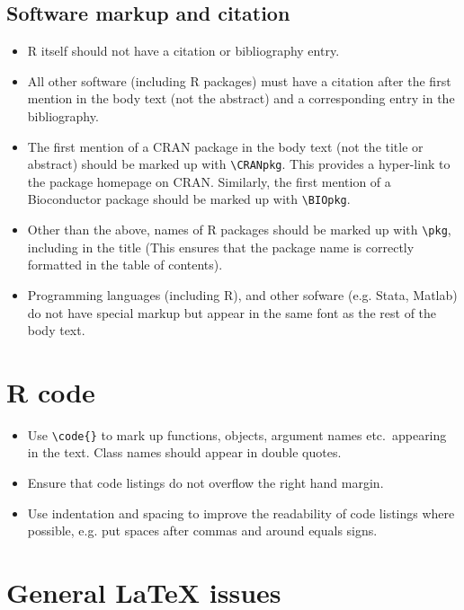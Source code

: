 \documentclass[11pt]{article}
\begin{document}
\subsection*{Software markup and citation}
\begin{itemize}
\item R itself should not have a citation or bibliography entry.
\item All other software (including R packages) must have a citation after
  the first mention in the body text (not the abstract) and a
  corresponding entry in the bibliography.
\item The first mention of a CRAN package in the body text (not the title or
  abstract) should be marked up with \verb+\CRANpkg+. This
  provides a hyper-link to the package homepage on CRAN. Similarly,
  the first mention of a Bioconductor package should be marked up with
  \verb+\BIOpkg+.
\item Other than the above, names of R packages should be marked up with 
  \verb+\pkg+, including in the title (This ensures that the
  package name is correctly formatted in the table of contents).
\item Programming languages (including R), and other sofware
  (e.g. Stata, Matlab) do not have special markup but appear in the
  same font as the rest of the body text.
\end{itemize}

\section*{R code}

\begin{itemize}
\item Use \verb+\code{}+ to mark up functions, objects, argument names etc.\
appearing in the text.  Class names should appear in double quotes.
\item Ensure that code listings do not overflow the right hand margin.
\item Use indentation and spacing to improve the readability of code
  listings where possible, e.g. put spaces after commas and around
  equals signs.
\end{itemize}

\section*{General LaTeX issues}
\end{document}
